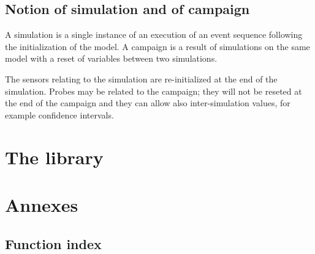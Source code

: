 \documentclass{book}
\begin{document}
\section{Notion of simulation and of campaign}

A simulation is a single instance of an execution of an event sequence
following the initialization of the model. A campaign is a
result of simulations on the same model with a reset of
variables between two simulations.

    The sensors relating to the simulation are re-initialized at the end of the
simulation. Probes may be related to the campaign; they will not be reseted at the end of the campaign and they can allow also inter-simulation values​​, for example confidence intervals.

%
\chapter{The library}

%

%
%
%
%
%
%
%
%
%

%
\chapter{Annexes}

\section{Function index}

\printindex
\end{document}
